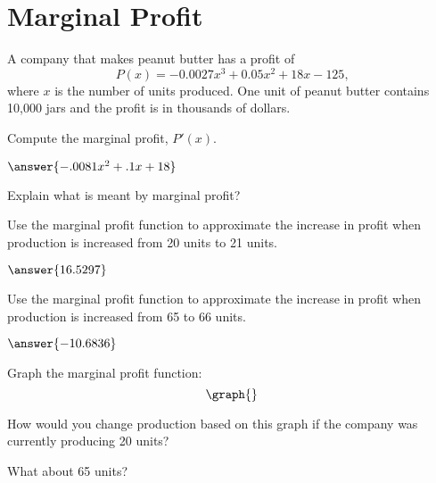 \documentclass{ximera}
\begin{document}
\section{Marginal Profit}
A company that makes peanut butter has a profit of $$P(x)=-0.0027x^3+0.05x^2+18x-125\text{,}$$ where $x$ is the number of units produced. One unit of peanut butter contains 10,000 jars and the profit is in thousands of dollars.
\begin{question}
Compute the marginal profit, $P'(x)$.

$\answer{-.0081x^2+.1x+18}$

Explain what is meant by marginal profit?
\begin{freeResponse}
\end{freeResponse}

Use the marginal profit function to approximate the increase in profit when production is increased from 20 units to 21 units.

$\answer{16.5297}$

Use the marginal profit function to approximate the increase in profit when production is increased from 65 to 66 units.

$\answer{-10.6836}$

Graph the marginal profit function:
\[
\graph{}
\]

How would you change production based on this graph if the company was currently producing 20 units?

\begin{multipleChoice}
\end{multipleChoice}

What about 65 units?

\begin{multipleChoice}
\end{multipleChoice}
\end{question}
\setcounter{problem}{0}
\end{document}
